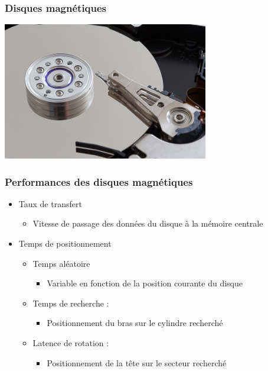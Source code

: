 \begin{frame}
\frametitle{Disques magnétiques}
\includegraphics[height=6cm]{../illustration/disque_dur.jpg}
\end{frame}

\begin{frame}
\frametitle{Performances des disques magnétiques}
\begin{itemize}
\item Taux de transfert
\begin{itemize}
\item Vitesse de passage des données du disque à la mémoire centrale
\end{itemize}
\item Temps de positionnement
\begin{itemize}
\item Temps aléatoire
\begin{itemize}
\item Variable en fonction de la position courante du disque
\end{itemize}

\item Temps de recherche : 
\begin{itemize}
\item Positionnement du bras sur le cylindre recherché
\end{itemize}
\item Latence de rotation :
\begin{itemize}
\item Positionnement de la tête sur le secteur recherché
\end{itemize}
\end{itemize}
\end{itemize}
\end{frame}


